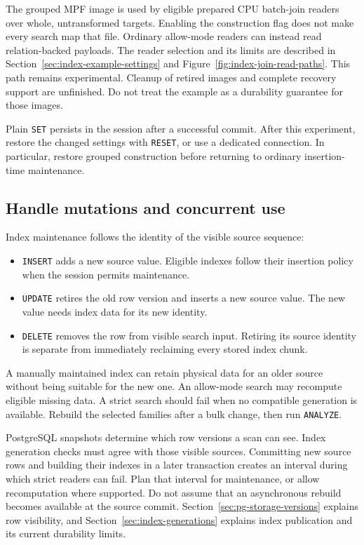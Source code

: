 The grouped MPF image is used by eligible prepared CPU batch-join readers
over whole, untransformed targets. Enabling the
construction flag does not make every search map that file. Ordinary
allow-mode readers can instead read relation-backed payloads. The reader
selection and its limits are described in
Section~\ref{sec:index-example-settings} and
Figure~\ref{fig:index-join-read-paths}.
This path remains experimental. Cleanup of retired images and complete
recovery support are unfinished. Do not treat the example as a durability
guarantee for those images.

Plain \texttt{SET} persists in the session after a successful commit.
After this experiment, restore the changed settings with \texttt{RESET},
or use a dedicated connection. In particular, restore grouped construction
before returning to ordinary insertion-time maintenance.

\subsection{Handle mutations and concurrent use}

Index maintenance follows the identity of the visible source sequence:
\begin{itemize}
  \item \texttt{INSERT} adds a new source value. Eligible indexes follow
    their insertion policy when the session permits maintenance.
  \item \texttt{UPDATE} retires the old row version and inserts a new
    source value. The new value needs index data for its new identity.
  \item \texttt{DELETE} removes the row from visible search input.
    Retiring its source identity is separate from immediately reclaiming
    every stored index chunk.
\end{itemize}

A manually maintained index can retain physical data for an older source
without being suitable for the new one. An allow-mode search may recompute
eligible missing data. A strict search should fail when no compatible
generation is available. Rebuild the selected families after a bulk
change, then run \texttt{ANALYZE}.

PostgreSQL snapshots determine which row versions a scan can see. Index
generation checks must agree with those visible sources. Committing new
source rows and building their indexes in a later transaction creates an
interval during which strict readers can fail. Plan that interval for
maintenance, or allow recomputation where supported. Do not assume that
an asynchronous rebuild becomes available at the source commit.
Section~\ref{sec:pg-storage-versions} explains row visibility, and
Section~\ref{sec:index-generations} explains index publication and its
current durability limits.

